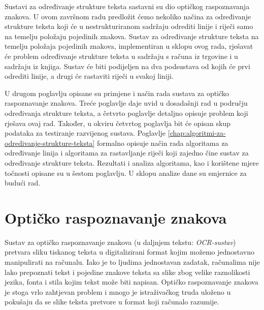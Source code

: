 \documentclass[times, utf8, zavrsni]{fer}
\begin{document}
Sustavi za određivanje strukture teksta sastavni su dio optičkog raspoznavanja
znakova. U ovom završnom radu predložit ćemo nekoliko načina za određivanje
strukture teksta koji će u nestrukturiranom sadržaju odrediti linije i riječi
samo na temelju položaju pojedinih znakova. Sustav za određivanje strukture
teksta na temelju položaja pojedinih znakova, implementiran u sklopu ovog rada,
rješavat će problem određivanje strukture teksta u sadržaju s računa iz
trgovine i u sadržaju iz knjiga. Sustav će biti podijeljen na dva podsustava od
kojih će prvi odrediti linije, a drugi će rastaviti riječi u svakoj liniji.

U drugom poglavlju opisane su primjene i način rada sustava za optičko
raspoznavanje znakova. Treće poglavlje daje uvid u dosadašnji rad u području
određivanja strukture teksta, a četvrto poglavlje detaljno opisuje problem koji
rješava ovaj rad. Također, u okviru četvrtog poglavlja bit će opisan skup
podataka za testiranje razvijenog sustava. Poglavlje
\ref{chap:algoritmi-za-odredivanje-strukture-teksta} formalno opisuje način rada
algoritama za određivanje linija i algoritama za rastavljanje riječi koji
zajedno čine sustav za određivanje strukture teksta. Rezultati i analiza
algoritama, kao i korištene mjere točnosti opisane su u šestom poglavlju. U
sklopu analize dane su smjernice za budući rad.
















\chapter{Optičko raspoznavanje znakova}
\label{chap:opticko-raspoznavanje-znakova}
Sustav za optičko raspoznavanje znakova  (u
daljnjem tekstu: \emph{OCR-sustav})
pretvara sliku tiskanog teksta u digitalizirani format kojim možemo jednostavno
manipulirati na računalu.
Iako je to ljudima jednostavan zadatak, računalima nije lako prepoznati tekst i
pojedine znakove teksta sa slike
zbog velike raznolikosti jezika, fonta i stila kojim tekst može biti napisan.
Optičko raspoznavanje znakova je stoga vrlo zahtjevan problem i mnogo je
istraživačkog truda uloženo u pokušaju
da se slike teksta pretvore u format koji računalo razumije. \citep
{DBLP:journals/corr/abs-1710-05703}
\end{document}
